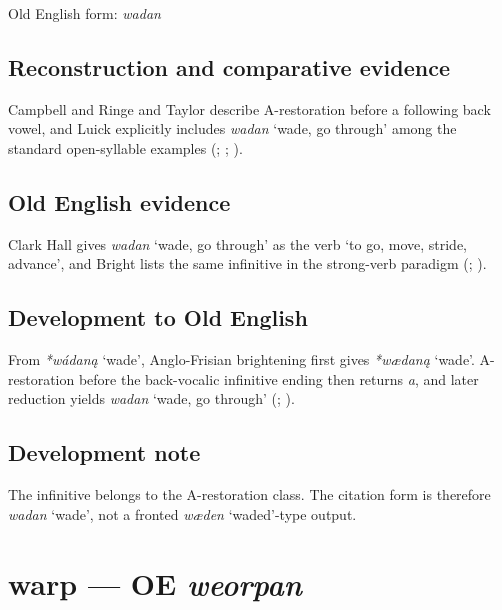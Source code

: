 \documentclass[
  british,
  a4paper,
  openany]{book}
\providecommand{\Recon}[1]{\emph{*#1}}
{\catcode`→=\active \global\def→{\ensuremath{\rightarrow}}}
\providecommand{\texorpdfstring}[2]{#1}
\providecommand{\Recon}[1]{\emph{*#1}}
{\catcode`→=\active \global\def→{\ensuremath{\rightarrow}}}
\begin{document}
Old English form: \emph{wadan}

\subsection{Reconstruction and comparative
evidence}\label{reconstruction-and-comparative-evidence-60}

Campbell and Ringe and Taylor describe A-restoration before a following
back vowel, and Luick explicitly includes {\emph{wadan}} `wade, go
through' among the standard open-syllable examples
(;
;
).

\subsection{Old English evidence}\label{old-english-evidence-60}

Clark Hall gives {\emph{wadan}} `wade, go through' as the verb `to go,
move, stride, advance', and Bright lists the same infinitive in the
strong-verb paradigm (;
).

\subsection{Development to Old
English}\label{development-to-old-english-60}

From \Recon{wádaną} `wade', Anglo-Frisian brightening first gives
\Recon{wædaną} `wade'. A-restoration before the back-vocalic infinitive
ending then returns \emph{a}, and later reduction yields {\emph{wadan}}
`wade, go through' (;
).

\subsection{Development note}\label{development-note-2}

The infinitive belongs to the A-restoration class. The citation form is
therefore \emph{wadan} `wade', not a fronted \emph{wæden} `waded'-type
output.

\section{\texorpdfstring{warp --- OE
\emph{weorpan}}{warp --- OE weorpan}}\label{warp-oe-weorpan}
\end{document}

